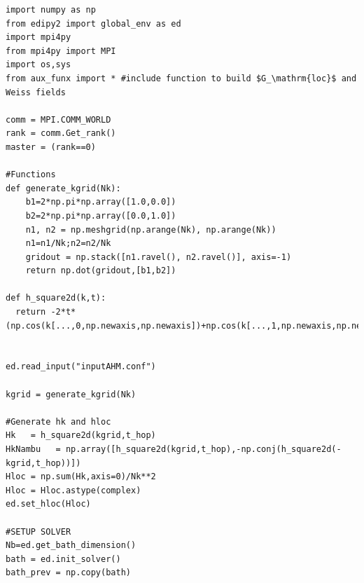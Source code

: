 \documentclass[edipack2.tex]{subfiles}
\begin{document}
\begin{lstlisting}[style=mypython,numbers=none,basicstyle={\scriptsize\ttfamily}]
import numpy as np
from edipy2 import global_env as ed
import mpi4py
from mpi4py import MPI
import os,sys
from aux_funx import * #include function to build $G_\mathrm{loc}$ and Weiss fields

comm = MPI.COMM_WORLD
rank = comm.Get_rank()
master = (rank==0)

#Functions
def generate_kgrid(Nk):
    b1=2*np.pi*np.array([1.0,0.0])
    b2=2*np.pi*np.array([0.0,1.0])
    n1, n2 = np.meshgrid(np.arange(Nk), np.arange(Nk))
    n1=n1/Nk;n2=n2/Nk
    gridout = np.stack([n1.ravel(), n2.ravel()], axis=-1)
    return np.dot(gridout,[b1,b2])

def h_square2d(k,t):
  return -2*t*(np.cos(k[...,0,np.newaxis,np.newaxis])+np.cos(k[...,1,np.newaxis,np.newaxis]))*np.eye(ed.Norb)
    

ed.read_input("inputAHM.conf")

kgrid = generate_kgrid(Nk)

#Generate hk and hloc
Hk   = h_square2d(kgrid,t_hop)
HkNambu   = np.array([h_square2d(kgrid,t_hop),-np.conj(h_square2d(-kgrid,t_hop))])
Hloc = np.sum(Hk,axis=0)/Nk**2
Hloc = Hloc.astype(complex)
ed.set_hloc(Hloc)

#SETUP SOLVER
Nb=ed.get_bath_dimension()
bath = ed.init_solver()
bath_prev = np.copy(bath)
\end{lstlisting}
\end{document}
